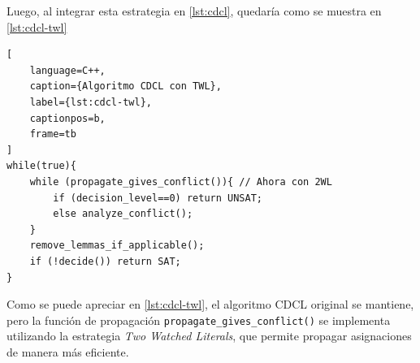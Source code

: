 Luego, al integrar esta estrategia en \ref{lst:cdcl}, quedar\'ia como se muestra en \ref{lst:cdcl-twl}

\begin{lstlisting}[
    language=C++,
    caption={Algoritmo CDCL con TWL},
    label={lst:cdcl-twl},
    captionpos=b,
    frame=tb
]
while(true){
    while (propagate_gives_conflict()){ // Ahora con 2WL
        if (decision_level==0) return UNSAT;
        else analyze_conflict();
    }
    remove_lemmas_if_applicable();
    if (!decide()) return SAT;
}

\end{lstlisting}

Como se puede apreciar en \ref{lst:cdcl-twl}, el algoritmo CDCL original se mantiene, pero la función de propagación \texttt{propagate\_gives\_conflict()} se implementa utilizando la estrategia \textit{Two Watched Literals}, que permite propagar asignaciones de manera más eficiente.





